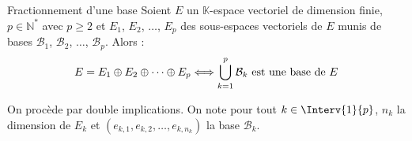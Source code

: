 \documentclass[french,11pt,twoside]{VcCours}
\newcommand{\Sum}[2]{\ensuremath{\textstyle{\sum\limits_{#1}^{#2}}}}
\begin{document}
\begin{Proposition}{Fractionnement d'une base}\label{UnionBase} Soient $E$ un $\mathbb{K}$-espace vectoriel de dimension finie, $p \in \mathbb{N}^*$ avec $p \geq 2$ et $E_1$, $E_2$, $\ldots$, $E_p$ des sous-espaces vectoriels de $E$ munis de bases $\mathcal{B}_1$, $\mathcal{B}_2$, $\ldots$, $\mathcal{B}_p$. Alors :
$$ E= E_1 \oplus E_2 \oplus \cdots \oplus E_p \Longleftrightarrow  \bigcup_{k=1}^p \mathcal{B}_k \hbox{ est une base de } E$$
\end{Proposition}

\begin{Demonstration}{} On procède par double implications. On note pour tout $k \in \Interv{1}{p}$, $n_k$ la dimension de $E_k$ et $(e_{k,1}, e_{k,2}, \ldots, e_{k,n_k})$ la base $\mathcal{B}_k$.

\medskip
%
%
%
%
%
\vspace{13cm}
\end{Demonstration}
\end{document}
